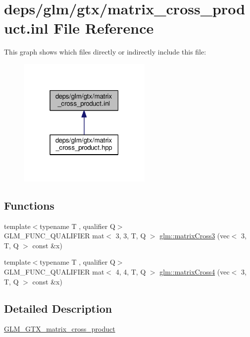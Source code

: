 \hypertarget{matrix__cross__product_8inl}{}\section{deps/glm/gtx/matrix\+\_\+cross\+\_\+product.inl File Reference}
\label{matrix__cross__product_8inl}
This graph shows which files directly or indirectly include this file\+:
\nopagebreak
\begin{figure}[H]
\begin{center}
\leavevmode
\includegraphics[width=183pt]{df/d49/matrix__cross__product_8inl__dep__incl}
\end{center}
\end{figure}
\subsection*{Functions}
\begin{DoxyCompactItemize}
\item 
{\footnotesize template$<$typename T , qualifier Q$>$ }\\G\+L\+M\+\_\+\+F\+U\+N\+C\+\_\+\+Q\+U\+A\+L\+I\+F\+I\+ER mat$<$ 3, 3, T, Q $>$ \hyperlink{group__gtx__matrix__cross__product_ga5802386bb4c37b3332a3b6fd8b6960ff}{glm\+::matrix\+Cross3} (vec$<$ 3, T, Q $>$ const \&x)
\item 
{\footnotesize template$<$typename T , qualifier Q$>$ }\\G\+L\+M\+\_\+\+F\+U\+N\+C\+\_\+\+Q\+U\+A\+L\+I\+F\+I\+ER mat$<$ 4, 4, T, Q $>$ \hyperlink{group__gtx__matrix__cross__product_ga20057fff91ddafa102934adb25458cde}{glm\+::matrix\+Cross4} (vec$<$ 3, T, Q $>$ const \&x)
\end{DoxyCompactItemize}


\subsection{Detailed Description}
\hyperlink{group__gtx__matrix__cross__product}{G\+L\+M\+\_\+\+G\+T\+X\+\_\+matrix\+\_\+cross\+\_\+product} 